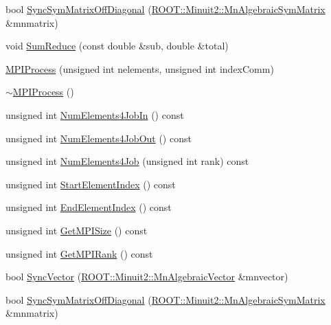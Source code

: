 \begin{DoxyCompactItemize}
\item 
bool \mbox{\hyperlink{classROOT_1_1Minuit2_1_1MPIProcess_ac00f83396ec6b7985dad640981a07657}{Sync\+Sym\+Matrix\+Off\+Diagonal}} (\mbox{\hyperlink{namespaceROOT_1_1Minuit2_a9e74ad97f5537a2e80e52b04d98ecc6e}{R\+O\+O\+T\+::\+Minuit2\+::\+Mn\+Algebraic\+Sym\+Matrix}} \&mnmatrix)
\item 
void \mbox{\hyperlink{classROOT_1_1Minuit2_1_1MPIProcess_ac28c4a6a09a1518bbfa5ed09b676bd7c}{Sum\+Reduce}} (const double \&sub, double \&total)
\item 
\mbox{\hyperlink{classROOT_1_1Minuit2_1_1MPIProcess_a43d72185b19c2e99f914ff408fd2755b}{M\+P\+I\+Process}} (unsigned int nelements, unsigned int index\+Comm)
\item 
\mbox{\hyperlink{classROOT_1_1Minuit2_1_1MPIProcess_ac2be6e4b9a721d7f1bf9512580bc113b}{$\sim$\+M\+P\+I\+Process}} ()
\item 
unsigned int \mbox{\hyperlink{classROOT_1_1Minuit2_1_1MPIProcess_ada3f8f6f1b28844db6cb6bd717521ffd}{Num\+Elements4\+Job\+In}} () const
\item 
unsigned int \mbox{\hyperlink{classROOT_1_1Minuit2_1_1MPIProcess_a8ab54fbeb2dd760265e0121573361c3f}{Num\+Elements4\+Job\+Out}} () const
\item 
unsigned int \mbox{\hyperlink{classROOT_1_1Minuit2_1_1MPIProcess_a9d9453545f311f9f9f995800ed518258}{Num\+Elements4\+Job}} (unsigned int rank) const
\item 
unsigned int \mbox{\hyperlink{classROOT_1_1Minuit2_1_1MPIProcess_a9e6b2dc6f57cc91bb11637b50ba15957}{Start\+Element\+Index}} () const
\item 
unsigned int \mbox{\hyperlink{classROOT_1_1Minuit2_1_1MPIProcess_af4445148831dec4961d5f8aa99aeb2c1}{End\+Element\+Index}} () const
\item 
unsigned int \mbox{\hyperlink{classROOT_1_1Minuit2_1_1MPIProcess_a9bd9f26ca9de3967741e014fcab5bb59}{Get\+M\+P\+I\+Size}} () const
\item 
unsigned int \mbox{\hyperlink{classROOT_1_1Minuit2_1_1MPIProcess_a86c50a55e3ae2651b74fa18443a13dd3}{Get\+M\+P\+I\+Rank}} () const
\item 
bool \mbox{\hyperlink{classROOT_1_1Minuit2_1_1MPIProcess_a179f3ea817399a73cbce05d1778ec128}{Sync\+Vector}} (\mbox{\hyperlink{namespaceROOT_1_1Minuit2_a62ed97730a1ca8d3fbaec64a19aa11c9}{R\+O\+O\+T\+::\+Minuit2\+::\+Mn\+Algebraic\+Vector}} \&mnvector)
\item 
bool \mbox{\hyperlink{classROOT_1_1Minuit2_1_1MPIProcess_ac00f83396ec6b7985dad640981a07657}{Sync\+Sym\+Matrix\+Off\+Diagonal}} (\mbox{\hyperlink{namespaceROOT_1_1Minuit2_a9e74ad97f5537a2e80e52b04d98ecc6e}{R\+O\+O\+T\+::\+Minuit2\+::\+Mn\+Algebraic\+Sym\+Matrix}} \&mnmatrix)

\end{DoxyCompactItemize}
